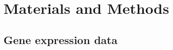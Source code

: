 
%


\chapter{Materials and Methods}
\label{cha:materials_and_methods}

\section{Gene expression data} %
\label{sec:gene_expression_data}
